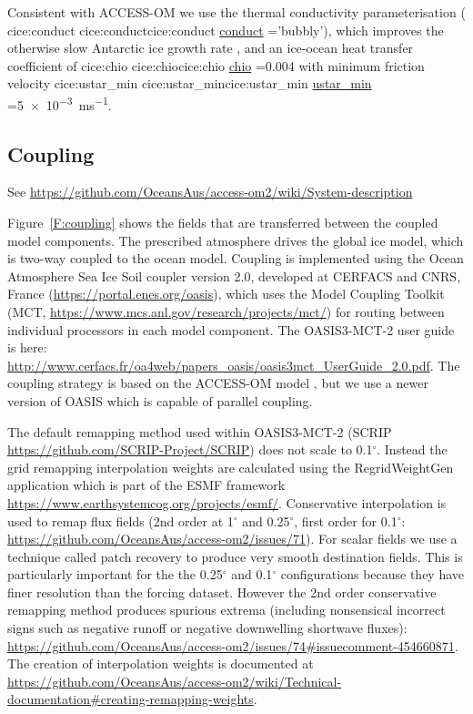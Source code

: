 \documentclass[11pt]{article}
\makeatletter
\newcommand{\WARNING}{\marginpar{\textcolor{red}{\danger}}\index{Warnings \textcolor{red}{\danger}}}
\newcommand*{\make@hex@label}[1]{%
  \def\hex@label{#1}%
  \@onelevel@sanitize\hex@label
  \EdefEscapeHex\hex@label{\hex@label}%
}
\newcommand*{\hexhyperlink}[2]{%
  \make@hex@label{#1}%
  \hyperlink{\hex@label}{#2}%
}
\newcommand{\cicelink}[2]{\hexhyperlink{cice:#2}{#1}}
\newcommand{\paramsty}[1]{\textsf{#1}}
\newcommand{\cice}[1]{\paramsty{\cicelink{#1}{#1}}\index{\paramsty{#1}}}
\makeatother
\begin{document}
Consistent with ACCESS-OM \citep[][table~2]{BiMarslandUotilaOFarrellFiedlerSullivanGriffiesZhouHirst2013a}
we use the \citet{PringleEickenTrodahlBackstrom2007a} thermal conductivity parameterisation (\cice{conduct}='bubbly'), which improves the otherwise slow Antarctic ice growth rate \citep{Hunke2010a}, and an ice-ocean heat transfer coefficient of \cice{chio}=0.004 with minimum friction velocity \cice{ustar_min}=\SI{5e-3}{ms^{-1}}.


\subsection{Coupling}
See \url{https://github.com/OceansAus/access-om2/wiki/System-description}

Figure~\ref{F:coupling} shows the fields that are transferred between the coupled model components.
The prescribed atmosphere drives the global ice model, which is two-way coupled to the ocean model.
Coupling is implemented using the Ocean Atmosphere Sea Ice Soil \citep[OASIS3-MCT, ][]{ValckeCraigCoquart2015a} coupler version 2.0, developed at CERFACS and CNRS, France (\url{https://portal.enes.org/oasis}), which uses the Model Coupling Toolkit (MCT, \url{https://www.mcs.anl.gov/research/projects/mct/}) for routing between individual processors in each model component.
The OASIS3-MCT-2 user guide is here: \url{http://www.cerfacs.fr/oa4web/papers_oasis/oasis3mct_UserGuide_2.0.pdf}. 
The coupling strategy is based on the ACCESS-OM model \citep{BiMarsland2010a}, but we use a newer version of OASIS which is capable of parallel coupling.

The default remapping method used within OASIS3-MCT-2 (SCRIP \url{https://github.com/SCRIP-Project/SCRIP}) does not scale to 0.1$^\circ$. 
Instead the grid remapping interpolation weights are calculated using the RegridWeightGen application which is part of the ESMF framework \url{https://www.earthsystemcog.org/projects/esmf/}.
Conservative interpolation is used to remap flux fields (2nd order at 1$^\circ$ and 0.25$^\circ$, first order for 0.1$^\circ$: \url{https://github.com/OceansAus/access-om2/issues/71}).
For scalar fields we use a technique called patch recovery \citep{Kritsikis2017, Khoei2007} to produce very smooth destination fields. 
This is particularly important for the the 0.25$^\circ$ and 0.1$^\circ$ configurations because they have finer resolution than the forcing dataset. 
However the 2nd order conservative remapping method produces spurious extrema \WARNING (including nonsensical incorrect signs such as negative runoff or negative downwelling shortwave fluxes): \url{https://github.com/OceansAus/access-om2/issues/74#issuecomment-454660871}.
The creation of interpolation weights is documented at \url{https://github.com/OceansAus/access-om2/wiki/Technical-documentation#creating-remapping-weights}.
\end{document}
